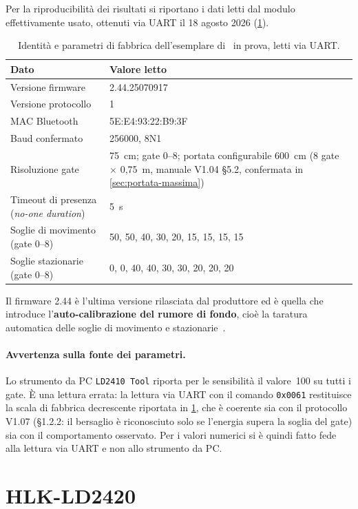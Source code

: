 Per la riproducibilità dei risultati si riportano i dati letti dal modulo
effettivamente usato, ottenuti via UART il 18 agosto 2026
(\cref{tab:identita}).

\begin{table}[htbp]
\centering
\caption{Identità e parametri di fabbrica dell'esemplare di \ldb\ in prova, letti
via UART.}
\label{tab:identita}
\small
\begin{tabular}{@{}ll@{}}
\toprule
\textbf{Dato} & \textbf{Valore letto} \\
\midrule
Versione firmware & 2.44.25070917 \\
Versione protocollo & 1 \\
MAC Bluetooth & 5E:E4:93:22:B9:3F \\
Baud confermato & 256000, 8N1 \\
Risoluzione gate & 75~cm; gate 0--8; portata configurabile 600~cm
  (8 gate $\times$ 0,75~m, manuale V1.04 \S5.2, confermata in \cref{sec:portata-massima}) \\
Timeout di presenza (\emph{no-one duration}) & 5~s \\
Soglie di movimento (gate 0--8) & 50, 50, 40, 30, 20, 15, 15, 15, 15 \\
Soglie stazionarie (gate 0--8) & 0, 0, 40, 40, 30, 30, 20, 20, 20 \\
\bottomrule
\end{tabular}
\end{table}

Il firmware 2.44 è l'ultima versione rilasciata dal produttore ed è quella che
introduce l'\textbf{auto-calibrazione del rumore di fondo}, cioè la taratura
automatica delle soglie di movimento e stazionarie~\cite{hilinkV244}.

\paragraph{Avvertenza sulla fonte dei parametri.} Lo strumento da PC
\texttt{LD2410 Tool} riporta per le sensibilità il valore~100 su tutti i gate. È
una lettura errata: la lettura via UART con il comando \texttt{0x0061} restituisce
la scala di fabbrica decrescente riportata in \cref{tab:identita}, che è coerente
sia con il protocollo V1.07 (\S1.2.2: il bersaglio è riconosciuto solo se
l'energia supera la soglia del gate) sia con il comportamento osservato. Per i
valori numerici si è quindi fatto fede alla lettura via UART e non allo strumento
da PC.

\section{HLK-LD2420}
\label{sec:ld2420}

